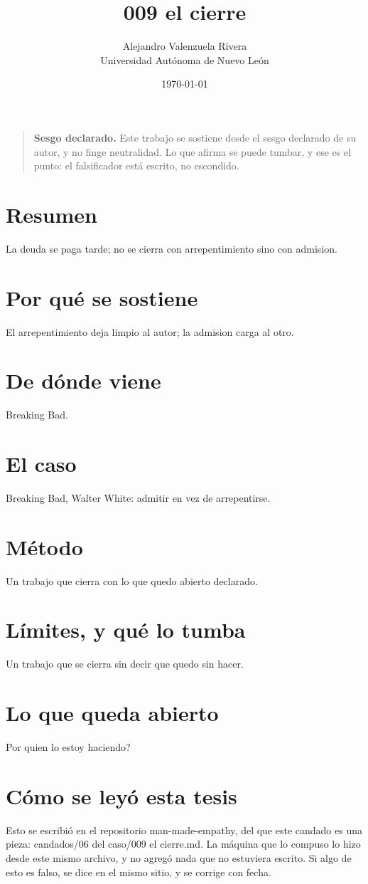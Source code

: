 \documentclass[11pt,a4paper]{article}
\title{009 el cierre}
\author{Alejandro Valenzuela Rivera\\\small Universidad Autónoma de Nuevo León}
\date{\today}
\begin{document}
\maketitle

\begin{quote}
\textbf{Sesgo declarado.} Este trabajo se sostiene desde el sesgo declarado de su autor, y no finge neutralidad. Lo que afirma se puede tumbar, y ese es el punto: el falsificador está escrito, no escondido.
\end{quote}

\section*{Resumen}
La deuda se paga tarde; no se cierra con arrepentimiento sino con admision.

\section{Por qué se sostiene}
El arrepentimiento deja limpio al autor; la admision carga al otro.

\section{De dónde viene}
Breaking Bad.

\section{El caso}
Breaking Bad, Walter White: admitir en vez de arrepentirse.

\section{Método}
Un trabajo que cierra con lo que quedo abierto declarado.

\section{Límites, y qué lo tumba}
Un trabajo que se cierra sin decir que quedo sin hacer.

\section{Lo que queda abierto}
\textquestiondown{}Por quien lo estoy haciendo?

\section*{Cómo se leyó esta tesis}
Esto se escribió en el repositorio man-made-empathy, del que este candado es una pieza: candados/06 del caso/009 el cierre.md. La máquina que lo compuso lo hizo desde este mismo archivo, y no agregó nada que no estuviera escrito. Si algo de esto es falso, se dice en el mismo sitio, y se corrige con fecha.
\end{document}
